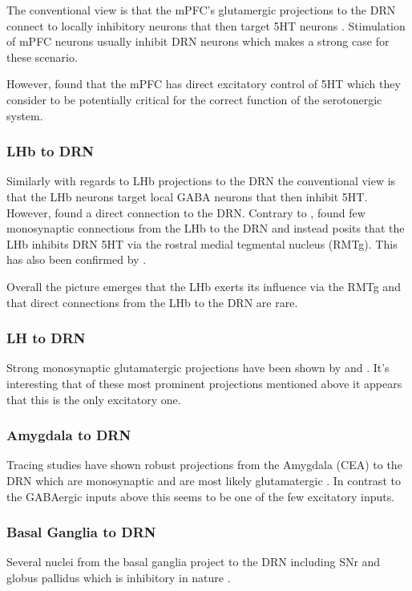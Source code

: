 \documentclass[12pt,a4paper]{article}
\begin{document}
The conventional view is that the mPFC’s glutamergic projections to
the DRN connect to locally inhibitory neurons that then target 5HT
neurons \citep{Celada2001}. Stimulation of mPFC neurons usually
inhibit DRN neurons which makes a strong case for these scenario.

However, \citep{PollakDorocic2014} found that the mPFC has direct
excitatory control of 5HT which they consider to be potentially
critical for the correct function of the serotonergic system.

\subsubsection{LHb to DRN}
Similarly with regards to LHb projections to the DRN the conventional
view is that the LHb neurons target local GABA neurons that then
inhibit 5HT. However, \citep{PollakDorocic2014} found a direct
connection to the DRN. Contrary to \citep{PollakDorocic2014},
\citep{Ogawa2014} found few monosynaptic connections from the LHb to
the DRN and instead posits that the LHb inhibits DRN 5HT via the
rostral medial tegmental nucleus (RMTg). This has also been confirmed
by \citep{Sego2014}.

Overall the picture emerges that the LHb exerts its influence via the
RMTg and that direct connections from the LHb to the DRN are rare.

\subsubsection{LH to DRN}
Strong monosynaptic glutamatergic projections have been shown by
\citep{Lee2003} and \citep{Aghajanian1990}. It's interesting that of
these most prominent projections mentioned above it appears that this
is the only excitatory one.

\subsubsection{Amygdala to DRN}
Tracing studies have shown robust projections from the Amygdala (CEA)
to the DRN \citep{PollakDorocic2014} which are monosynaptic and are
most likely glutamatergic \citep{Swanson1998}. In contrast to the
GABAergic inputs above this seems to be one of the few excitatory
inputs.

\subsubsection{Basal Ganglia to DRN}
Several nuclei from the basal ganglia project to the DRN including SNr
and globus pallidus which is inhibitory in nature
\citep{PollakDorocic2014}.
\end{document}
